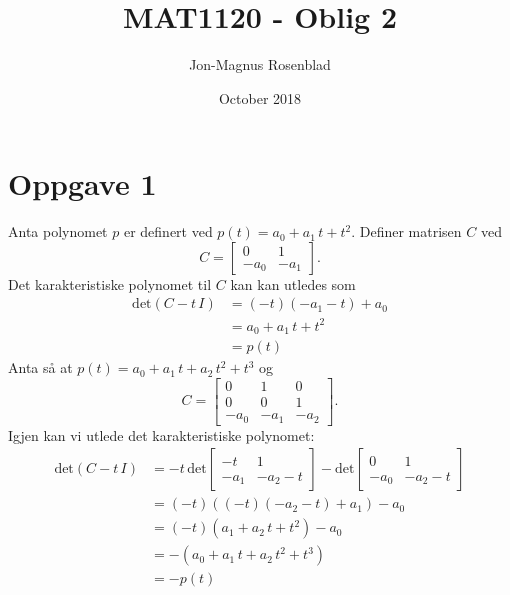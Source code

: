 \documentclass{article}[norsk]
\title{MAT1120 - Oblig 2}
\author{Jon-Magnus Rosenblad}
\date{October 2018}
\begin{document}
\maketitle
\section*{Oppgave 1}
Anta polynomet $p$ er definert ved $p(t)=a_0+a_1\,t+t^2$. Definer matrisen $C$ ved
\begin{equation*}
C=\begin{bmatrix}
	0&1\\
    -a_0&-a_1
\end{bmatrix}.
\end{equation*}
Det karakteristiske polynomet til $C$ kan kan utledes som 
\begin{equation*} \begin{aligned}
	\text{det}\left(C-t\,I\right) &= (-t)(-a_1-t)+a_0\\
    &=a_0+a_1\,t+t^2\\
    &=p(t)
\end{aligned} \end{equation*}
Anta så at $p(t)=a_0 + a_1\,t+a_2\,t^2+t^3$ og
\begin{equation*}
	C=\begin{bmatrix}
    	0&1&0\\
        0&0&1\\
        -a_0&-a_1&-a_2
	\end{bmatrix}.
\end{equation*}
Igjen kan vi utlede det karakteristiske polynomet:
\begin{equation*} \begin{aligned}
	\text{det}\left(C-t\,I\right)&=-t\,\text{det}\begin{bmatrix} 
    	-t&1\\
        -a_1&-a_2-t
	\end{bmatrix} - \text{det}\begin{bmatrix} 
    	0&1\\
        -a_0&-a_2-t
	\end{bmatrix}\\
    &=(-t)\left((-t)(-a_2-t)+a_1\right) - a_0\\
    &=(-t)(a_1 + a_2\,t+t^2)-a_0\\
    &=-\left(a_0 + a_1\,t+a_2\,t^2+t^3\right)\\
    &=-p(t)
\end{aligned} \end{equation*}
\end{document}
